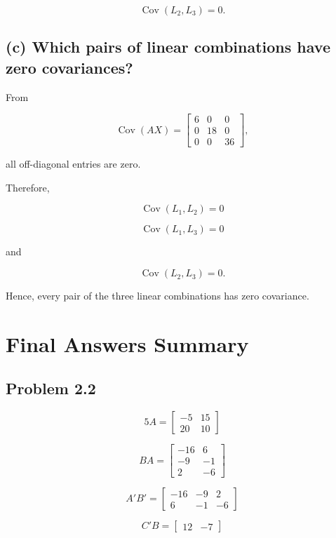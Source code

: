 \documentclass[12pt]{article}
\begin{document}
\[
\boxed{
\operatorname{Cov}(L_2,L_3)=0.
}
\]

\subsection*{(c) Which pairs of linear combinations have zero covariances?}

From

\[
\operatorname{Cov}(AX)
=
\begin{bmatrix}
6&0&0\\
0&18&0\\
0&0&36
\end{bmatrix},
\]

all off-diagonal entries are zero.

Therefore,

\[
\boxed{
\operatorname{Cov}(L_1,L_2)=0
}
\]

\[
\boxed{
\operatorname{Cov}(L_1,L_3)=0
}
\]

and

\[
\boxed{
\operatorname{Cov}(L_2,L_3)=0.
}
\]

Hence, every pair of the three linear combinations has zero covariance.

\section*{Final Answers Summary}

\subsection*{Problem 2.2}

\[
\boxed{
5A=
\begin{bmatrix}
-5&15\\
20&10
\end{bmatrix}}
\]

\[
\boxed{
BA=
\begin{bmatrix}
-16&6\\
-9&-1\\
2&-6
\end{bmatrix}}
\]

\[
\boxed{
A'B'=
\begin{bmatrix}
-16&-9&2\\
6&-1&-6
\end{bmatrix}}
\]

\[
\boxed{
C'B=
\begin{bmatrix}
12&-7
\end{bmatrix}}
\]
\end{document}
